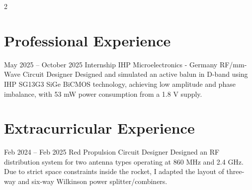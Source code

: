 \documentclass[
	10pt, %
]{FreemanCV}
\begin{document}
\begin{paracol}{2}
\medskip %


\section{Professional Experience}





\jobentry
	{May 2025 -- October 2025} %
	{Internship} %
	{IHP Microelectronics - Germany} %
	{RF/mm-Wave Circuit Designer} %
	{{Designed and simulated an active balun in D-band using IHP SG13G3 SiGe BiCMOS technology, achieving low amplitude and phase imbalance, with 53 mW power consumption from a 1.8 V supply.}
        } %

 \section{Extracurricular Experience}

 \jobentry
	{Feb 2024 -- Feb 2025} %
	{} %
	{Red Propulsion} %
	{Circuit Designer} %
	{Designed an RF distribution system for two antenna types operating at 860 MHz and 2.4 GHz. Due to strict space constraints inside the rocket, I adapted the layout of three-way and six-way Wilkinson power splitter/combiners.} %



\end{paracol}
\end{document}
